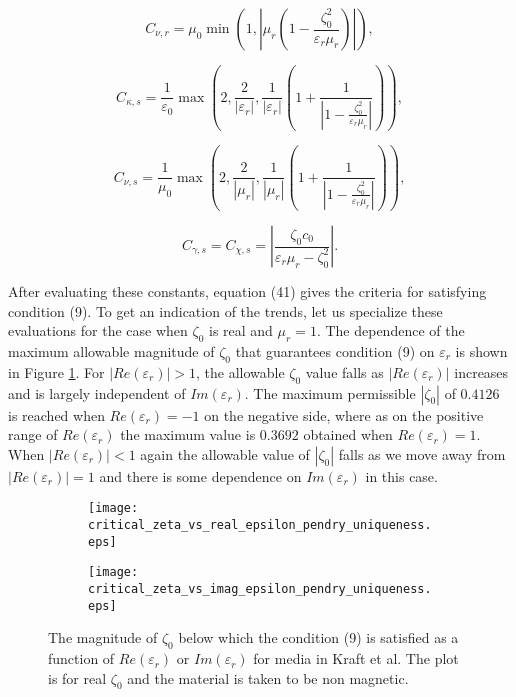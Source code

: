 \begin{equation}
\tag{90}
C_{\nu,r} =  \mu_0 \min(1, |\mu_r(1 - \frac{\zeta_0^2}{\varepsilon_r\mu_r})|), 
\end{equation}

\begin{equation}
\tag{91}
C_{\kappa,s} =  \frac{1}{\varepsilon_0} \max(2, \frac{2}{|\varepsilon_r|}, \frac{1}{|\varepsilon_r|}(1 + \frac{1}{|1 - \frac{\zeta_0^2}{\varepsilon_r\mu_r}|})),
\end{equation}

\begin{equation}
\tag{92}
C_{\nu,s} = \frac{1}{\mu_0} \max(2, \frac{2}{|\mu_r|}, \frac{1}{|\mu_r|}(1 + \frac{1}{|1 - \frac{\zeta_0^2}{\varepsilon_r\mu_r}|})),
\end{equation}

\begin{equation}
\tag{93}
C_{\gamma,s} =  C_{\chi,s} = |\frac{\zeta_0c_0}{\varepsilon_r\mu_r - \zeta_0^2}|. 
\end{equation}

After evaluating these constants, equation (41) gives the criteria for satisfying condition (9).
To get an indication of the trends, let us specialize these evaluations for the case when $\zeta_0$ is real 
and $\mu_r = 1$. 
The dependence of the maximum allowable magnitude of $\zeta_0$ that guarantees condition (9) on $\varepsilon_r$ 
is shown in Figure \ref{fi:critical_zeta_vs_epsilonr_uniqueness}.
For $|Re(\varepsilon_r)| > 1$, the allowable $\zeta_0$ value falls as $|Re(\varepsilon_r)|$ increases and is largely independent of $Im(\varepsilon_r)$.
The maximum permissible $|\zeta_0|$ of $0.4126$ is reached when $Re(\varepsilon_r) = -1$ on the negative side, where as on the positive range of $Re(\varepsilon_r)$ 
the maximum  value is $0.3692$ obtained when $Re(\varepsilon_r) = 1$.   
When $|Re(\varepsilon_r)| < 1$ again the allowable value of $|\zeta_0|$ falls as we move away from $|Re(\varepsilon_r)|=1$ 
and there is some dependence on $Im(\varepsilon_r)$ in this case.

\begin{figure}[H]
\centering
\begin{subfigure}[b]{0.49\textwidth}
\texttt{[image: critical\_zeta\_vs\_real\_epsilon\_pendry\_uniqueness.eps]}
\end{subfigure}
%
\begin{subfigure}[b]{0.49\textwidth}
\centering
\texttt{[image: critical\_zeta\_vs\_imag\_epsilon\_pendry\_uniqueness.eps]}
\end{subfigure}
\caption{The magnitude of $\zeta_0$ below which the condition (9) is satisfied as a function of $Re(\varepsilon_r)$ or $Im(\varepsilon_r)$ for media in Kraft et al.
The plot is for real $\zeta_0$ and the material is taken to be non magnetic.}
\label{fi:critical_zeta_vs_epsilonr_uniqueness}
\end{figure}

